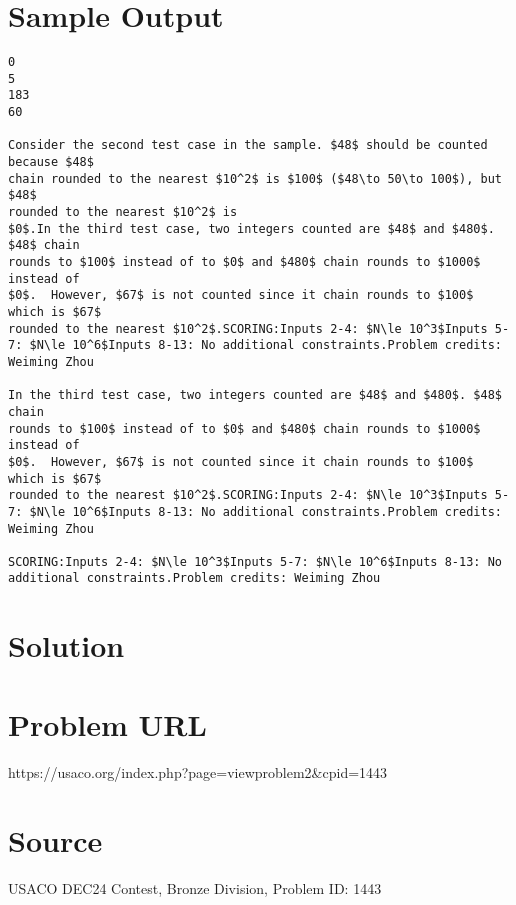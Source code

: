 \documentclass[12pt]{article}
\begin{document}
\section*{Sample Output}
\begin{verbatim}
0
5
183
60

Consider the second test case in the sample. $48$ should be counted because $48$
chain rounded to the nearest $10^2$ is $100$ ($48\to 50\to 100$), but $48$
rounded to the nearest $10^2$ is
$0$.In the third test case, two integers counted are $48$ and $480$. $48$ chain 
rounds to $100$ instead of to $0$ and $480$ chain rounds to $1000$ instead of
$0$.  However, $67$ is not counted since it chain rounds to $100$ which is $67$
rounded to the nearest $10^2$.SCORING:Inputs 2-4: $N\le 10^3$Inputs 5-7: $N\le 10^6$Inputs 8-13: No additional constraints.Problem credits: Weiming Zhou

In the third test case, two integers counted are $48$ and $480$. $48$ chain 
rounds to $100$ instead of to $0$ and $480$ chain rounds to $1000$ instead of
$0$.  However, $67$ is not counted since it chain rounds to $100$ which is $67$
rounded to the nearest $10^2$.SCORING:Inputs 2-4: $N\le 10^3$Inputs 5-7: $N\le 10^6$Inputs 8-13: No additional constraints.Problem credits: Weiming Zhou

SCORING:Inputs 2-4: $N\le 10^3$Inputs 5-7: $N\le 10^6$Inputs 8-13: No additional constraints.Problem credits: Weiming Zhou
\end{verbatim}

\section*{Solution}


\section*{Problem URL}
https://usaco.org/index.php?page=viewproblem2&cpid=1443

\section*{Source}
USACO DEC24 Contest, Bronze Division, Problem ID: 1443
\end{document}
